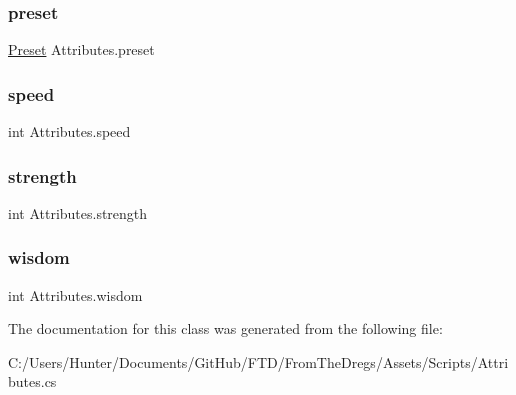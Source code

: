 \mbox{\label{class_attributes_ad6b0d037f9b58413a7cb7be3065cf743}} 
\subsubsection{\texorpdfstring{preset}{preset}}
{\footnotesize\ttfamily \mbox{\hyperlink{class_attributes_a2dcc4757e5dd7b7d518f43f4f194d175}{Preset}} Attributes.\+preset\hspace{0.3cm}{\ttfamily [get]}}

\mbox{\label{class_attributes_aa67231ed5d1163506d8d2d559a98e125}} 
\subsubsection{\texorpdfstring{speed}{speed}}
{\footnotesize\ttfamily int Attributes.\+speed\hspace{0.3cm}{\ttfamily [get]}}

\mbox{\label{class_attributes_a80e15a2316352cfba56fc1d4077dd432}} 
\subsubsection{\texorpdfstring{strength}{strength}}
{\footnotesize\ttfamily int Attributes.\+strength\hspace{0.3cm}{\ttfamily [get]}}

\mbox{\label{class_attributes_a48ec0beacd46bb9b9e206becde146d69}} 
\subsubsection{\texorpdfstring{wisdom}{wisdom}}
{\footnotesize\ttfamily int Attributes.\+wisdom\hspace{0.3cm}{\ttfamily [get]}}



The documentation for this class was generated from the following file\+:\begin{DoxyCompactItemize}
\item 
C\+:/\+Users/\+Hunter/\+Documents/\+Git\+Hub/\+F\+T\+D/\+From\+The\+Dregs/\+Assets/\+Scripts/Attributes.\+cs\end{DoxyCompactItemize}
